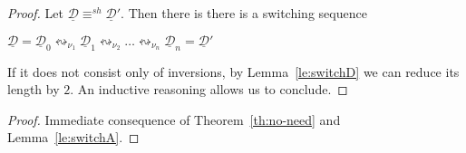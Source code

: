 \documentclass[a4paper,UKenglish,cleveref,pdftex, thm-restate,numberwithinsect,anonymous]{lipics}
\newcommand{\dder}[1]{\mathscr{#1}}
\newcommand{\der}[1]{\underline{\dder{#1}}}
\newcommand{\shift}[1]{\ensuremath{\mathrel{{\leftrightsquigarrow}_{#1}}}}
\newcommand{\shifteq}[1][]{\ensuremath{\mathrel{{\equiv}^\mathit{sh}_{#1}}}}
\begin{document}
\thNoNeed*
\label{thNoNeed-proof}


\begin{proof}
  Let $\der{D} \shifteq \der{D}'$. Then there is there is a switching
  sequence
  \begin{center}
    $\der{D} = \der{D}_0 \shift{\nu_1} \der{D}_1 \shift{\nu_2} \ldots
    \shift{\nu_n} \der{D}_n=\der{D}'$
  \end{center}
  If it does not consist only of inversions, by Lemma~\ref{le:switchD}
  we can reduce its length by $2$. An inductive reasoning allows us to
  conclude.
\end{proof}


\coCanonical*
\label{coCanonical-proof}

\begin{proof}
  Immediate consequence of Theorem~\ref{th:no-need} and Lemma~\ref{le:switchA}.
\end{proof}
\end{document}
